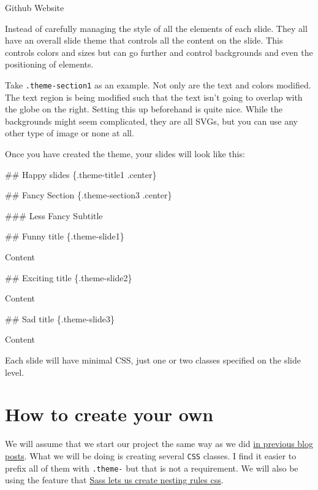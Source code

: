 \documentclass[
  letterpaper,
  DIV=11,
  numbers=noendperiod]{scrreprt}
\newenvironment{Shaded}{\begin{snugshade}}{\end{snugshade}}
\newcommand{\FunctionTok}[1]{\textcolor[rgb]{0.28,0.35,0.67}{#1}}
\newcommand{\NormalTok}[1]{\textcolor[rgb]{0.00,0.23,0.31}{#1}}
\begin{document}
 Github  Website

Instead of carefully managing the style of all the elements of each
slide. They all have an overall slide theme that controls all the
content on the slide. This controls colors and sizes but can go further
and control backgrounds and even the positioning of elements.

Take \texttt{.theme-section1} as an example. Not only are the text and
colors modified. The text region is being modified such that the text
isn't going to overlap with the globe on the right. Setting this up
beforehand is quite nice. While the backgrounds might seem complicated,
they are all SVGs, but you can use any other type of image or none at
all.

Once you have created the theme, your slides will look like this:

\begin{Shaded}
\begin{Highlighting}[]
\FunctionTok{\#\# Happy slides \{.theme{-}title1 .center\}}

\FunctionTok{\#\# Fancy Section \{.theme{-}section3 .center\}}

\FunctionTok{\#\#\# Less Fancy Subtitle}

\FunctionTok{\#\# Funny title \{.theme{-}slide1\}}

\NormalTok{Content}

\FunctionTok{\#\# Exciting title \{.theme{-}slide2\}}

\NormalTok{Content}

\FunctionTok{\#\# Sad title \{.theme{-}slide3\}}

\NormalTok{Content}
\end{Highlighting}
\end{Shaded}

Each slide will have minimal CSS, just one or two classes specified on
the slide level.

\section{How to create your own}\label{how-to-create-your-own}

We will assume that we start our project the same way as we did
\href{https://www.emilhvitfeldt.com/post/slidecraft-theme-variants/\#the-sass-basics}{in
previous blog posts}. What we will be doing is creating several
\texttt{CSS} classes. I find it easier to prefix all of them with
\texttt{.theme-} but that is not a requirement. We will also be using
the feature that
\href{https://sass-lang.com/documentation/style-rules/\#nesting}{Sass
lets us create nesting rules css}.
\end{document}
